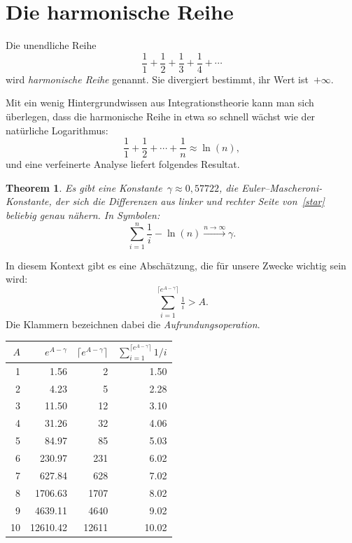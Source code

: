 \documentclass[twoside]{../zirkelblatt1415}
\theoremstyle{definition}
\theoremstyle{plain}
\newtheorem{thm}[defn]{Theorem}
\theoremstyle{remark}
\begin{document}
\section{Die harmonische Reihe}
\label{sect:harmonische-reihe}

Die unendliche Reihe
\[ \frac{1}{1} + \frac{1}{2} + \frac{1}{3} + \frac{1}{4} + \cdots \]
wird \emph{harmonische Reihe} genannt. Sie divergiert bestimmt, ihr Wert
ist~$+\infty$.

Mit ein wenig Hintergrundwissen aus Integrationstheorie kann man sich
überlegen, dass die harmonische Reihe in etwa so schnell wächst wie der
natürliche Logarithmus:
\begin{equation}
  \label{star}
  \tag{$\star$}
  \frac{1}{1} + \frac{1}{2} + \cdots + \frac{1}{n} \approx \ln(n),
\end{equation}
und eine verfeinerte Analyse liefert folgendes Resultat.

\begin{thm}Es gibt eine Konstante~$\gamma \approx 0{,}57722$, die
\emph{Euler--Mascheroni-Konstante}, der sich die Differenzen aus linker und
rechter Seite von~\eqref{star} beliebig genau nähern. In Symbolen:
\[ \sum_{i=1}^n \frac{1}{i} - \ln(n) \xrightarrow{n \to \infty}
\gamma. \]
\end{thm}

In diesem Kontext gibt es eine Abschätzung, die für unsere Zwecke wichtig sein wird:
\[ \sum_{i=1}^{\lceil e^{A-\gamma} \rceil} \tfrac{1}{i} > A. \]
Die Klammern bezeichnen dabei die \emph{Aufrundungsoperation}.

\begin{center}\begin{tabular}{rrrr}
  \toprule
  $A$ & $e^{A-\gamma}$ & $\lceil e^{A-\gamma} \rceil$ & $\sum_{i=1}^{\lceil e^{A-\gamma} \rceil} 1/i$ \\\midrule
   1 &     1.56 &     2 &  1.50 \\
   2 &     4.23 &     5 &  2.28 \\
   3 &    11.50 &    12 &  3.10 \\
   4 &    31.26 &    32 &  4.06 \\
   5 &    84.97 &    85 &  5.03 \\
   6 &   230.97 &   231 &  6.02 \\
   7 &   627.84 &   628 &  7.02 \\
   8 &  1706.63 &  1707 &  8.02 \\
   9 &  4639.11 &  4640 &  9.02 \\
  10 & 12610.42 & 12611 & 10.02 \\
  \bottomrule
\end{tabular}\end{center}
\end{document}
